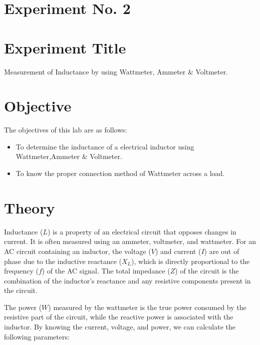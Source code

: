 \documentclass[a4paper,12pt]{article}
\begin{document}
	
	\section{Experiment No. 2}
	\section{Experiment Title }
Measurement of Inductance by using Wattmeter, Ammeter \& Voltmeter.
	\section{Objective}
	The objectives of this lab are as follows:
	\begin{itemize}
		\item To determine the inductance of a electrical inductor using Wattmeter,Ammeter \& Voltmeter.
		\item To know the proper connection method of Wattmeter across a load.
	\end{itemize}
	
	\section{Theory}
	
	Inductance (\( L \)) is a property of an electrical circuit that opposes changes in current. It is often measured using an ammeter, voltmeter, and wattmeter. For an AC circuit containing an inductor, the voltage (\( V \)) and current (\( I \)) are out of phase due to the inductive reactance (\( X_L \)), which is directly proportional to the frequency (\( f \)) of the AC signal. The total impedance (\( Z \)) of the circuit is the combination of the inductor's reactance and any resistive components present in the circuit.
	
	The power (\( W \)) measured by the wattmeter is the true power consumed by the resistive part of the circuit, while the reactive power is associated with the inductor. By knowing the current, voltage, and power, we can calculate the following parameters:
	
\end{document}
